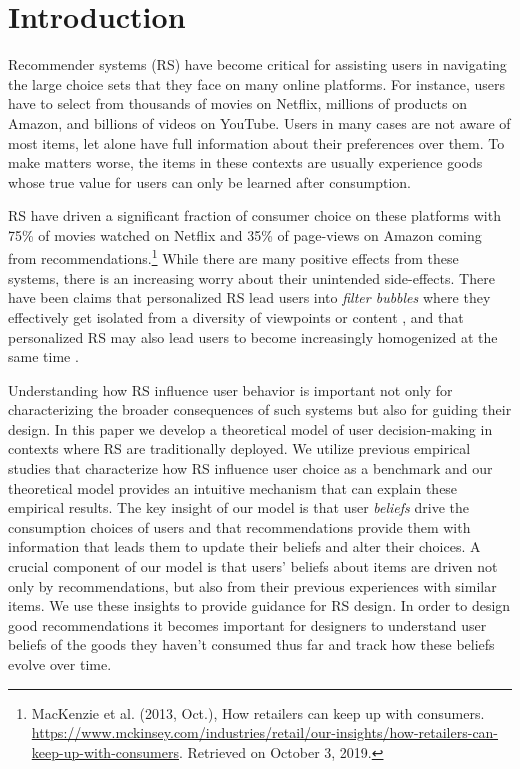 \documentclass[manuscript]{acmart}
\title[\PaperTitle]{\PaperTitle}
\begin{document}
\maketitle


\section{Introduction}

Recommender systems (RS) have become critical for assisting users in navigating the large choice sets that they face on many online platforms. For instance, users have to select from thousands of movies on Netflix, millions of products on Amazon, and billions of videos on YouTube. Users in many cases are not aware of most items, let alone have full information about their preferences over them. To make matters worse, the items in these contexts are usually experience goods whose true value for users can only be learned after consumption.
\par

RS have driven a significant fraction of consumer choice on these platforms with 75\% of movies watched on Netflix and 35\% of page-views on Amazon coming from recommendations.\footnote{MacKenzie et al. (2013, Oct.),  How retailers can keep up with consumers. \url{https://www.mckinsey.com/industries/retail/our-insights/how-retailers-can-keep-up-with-consumers}. Retrieved on October 3, 2019.} While there are many positive effects from these systems, there is an increasing worry about their unintended side-effects. There have been claims that personalized RS lead users into \textit{filter bubbles} where they effectively get isolated from a diversity of viewpoints or content \cite{pariser2011filter}, and that personalized RS may also lead users to become increasingly homogenized at the same time \cite{chaney2018algorithmic, hosanagar2013will}.
\par
Understanding how RS influence user behavior is important not only for characterizing the broader consequences of such systems but also for guiding their design. In this paper we develop a theoretical model of user decision-making in contexts where RS are traditionally deployed. We utilize previous empirical studies that characterize how RS influence user choice as a benchmark and our theoretical model provides an intuitive mechanism that can explain these empirical results. The key insight of our model is that user \textit{beliefs} drive the consumption choices of users and that recommendations provide them with information that leads them to update their beliefs and alter their choices. A crucial component of our model is that users' beliefs about items are driven not only by recommendations, but also from their previous experiences with similar items. We use these insights to provide guidance for RS design. In order to design good recommendations it becomes important for designers to understand user beliefs of the goods they haven't consumed thus far and track how these beliefs evolve over time.
\end{document}
